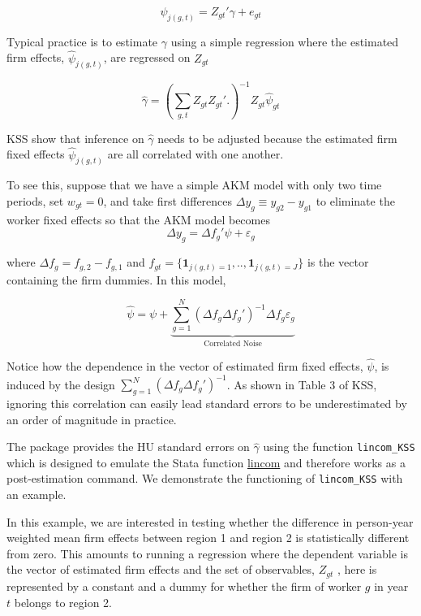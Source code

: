 \documentclass[11pt]{article}
\begin{document}
\begin{equation}
\psi_{j(g,t)}=Z_{gt}'\gamma+e_{gt}
\end{equation}

Typical practice is to estimate \(\gamma\) using a simple regression
where the estimated firm effects, \(\hat{\psi}_{j(g,t)}\), are regressed
on \(Z_{gt}\)

\begin{equation}
\hat{\gamma}=\left(\sum_{g,t}Z_{gt}Z_{gt}'.
\right)^{-1}Z_{gt}\hat{\psi}_{gt}
\end{equation}

KSS show that inference on \(\hat{\gamma}\) needs to be adjusted because the estimated firm fixed effects \(\hat{\psi}_{j(g,t)}\) are all correlated with one another.

To see this, suppose that we have a simple AKM model with only two time
periods, set \(w_{gt}=0\), and take first differences
\(\Delta y_{g}\equiv y_{g2}-y_{g1}\) to eliminate the worker fixed
effects so that the AKM model becomes \begin{equation}
\Delta y_{g}=\Delta f_{g}'\psi+\varepsilon_{g}
\end{equation}

where \(\Delta f_{g}=f_{g,2}-f_{g,1}\) and
\(f_{gt}=\{\mathbf{1}_{j(g,t)=1},..,\mathbf{1}_{j(g,t)=J}\}\) is the
vector containing the firm dummies. In this model,

\begin{equation}
\hat{\psi}=\psi+\underbrace{\sum_{g=1}^{N}(\Delta f_{g}\Delta f_{g}')^{-1}\Delta f_{g}\varepsilon_{g}}_{\text{Correlated Noise}}
\end{equation}

Notice how the dependence in the vector of estimated firm fixed effects,
\(\hat{\psi}\), is induced by the design
\(\sum_{g=1}^{N}(\Delta f_{g}\Delta f_{g}')^{-1}\). As shown in
Table 3 of KSS, ignoring this correlation can easily lead standard
errors to be underestimated by an order of magnitude in practice.

The package provides the HU standard errors on \(\hat{\gamma}\)
using the function \texttt{lincom\_KSS} which is designed to emulate the Stata
function \href{https://www.stata.com/manuals13/rlincom.pdf}{lincom} and therefore works as a post-estimation
command. We demonstrate the functioning of \texttt{lincom\_KSS} with an
example.

In this example, we are interested in testing whether the difference in
person-year weighted mean firm effects between region 1 and region 2 is
statistically different from zero. This amounts to running a regression
where the dependent variable is the vector of estimated firm effects and
the set of observables, \(Z_{gt}\) , here is represented by a constant
and a dummy for whether the firm of worker \(g\) in year \(t\) belongs
to region 2.
\end{document}
